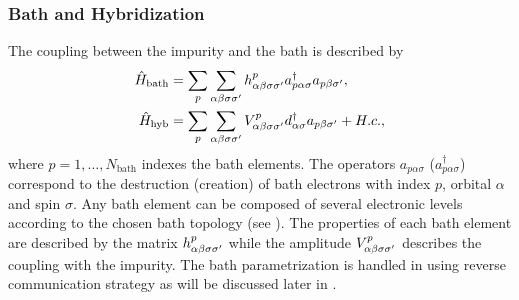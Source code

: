 \documentclass[edipack_sp.tex]{subfiles}
\begin{document}
\subsubsection{Bath and Hybridization}
The coupling between the impurity and the bath is described by
\begin{equation}\label{Hbath}
  \begin{split}
    \hat{H}_\mathrm{bath} &=
    \sum_p\sum_{\alpha\beta\sigma\sigma'}h^p_{\alpha\beta\sigma\sigma'}a^\dagger_{p\alpha\sigma}a_{p\beta\sigma'},\\
    \hat{H}_\mathrm{hyb} &= \sum_p\sum_{\alpha\beta\sigma\sigma'}V^p_{\alpha\beta\sigma\sigma'}d^\dagger_{\alpha\sigma}a_{p\beta\sigma'}+H.c., \\
\end{split}
\end{equation}
where $p=1,\dots,N_\mathrm{bath}$ indexes the
bath elements. The operators $a_{p\alpha\sigma}$
($a^\dagger_{p\alpha\sigma}$) correspond to the destruction (creation) of
bath electrons with index $p$, orbital $\alpha$ and spin $\sigma$.
Any bath element can be composed of several electronic levels
according to the chosen bath topology (see ). The  properties of each bath element are described by the
matrix $h^p_{\alpha\beta\sigma\sigma'}$ while the amplitude
$V^p_{\alpha\beta\sigma\sigma'}$ describes the coupling with the impurity.   
The bath parametrization is handled in \NAME using reverse communication strategy as will be discussed later in .  
\end{document}
